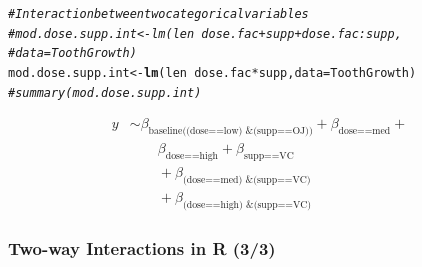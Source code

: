 \documentclass{beamer}\usepackage[]{graphicx}\usepackage[]{color}
\makeatletter
\newcommand{\hlcom}[1]{\textcolor[rgb]{0.678,0.584,0.686}{\textit{#1}}}%
\newcommand{\hlopt}[1]{\textcolor[rgb]{0,0,0}{#1}}%
\newcommand{\hlstd}[1]{\textcolor[rgb]{0.345,0.345,0.345}{#1}}%
\newcommand{\hlkwb}[1]{\textcolor[rgb]{0.69,0.353,0.396}{#1}}%
\newcommand{\hlkwc}[1]{\textcolor[rgb]{0.333,0.667,0.333}{#1}}%
\newcommand{\hlkwd}[1]{\textcolor[rgb]{0.737,0.353,0.396}{\textbf{#1}}}%
\newenvironment{kframe}{%
 \def\at@end@of@kframe{}%
 \ifinner\ifhmode%
  \def\at@end@of@kframe{\end{minipage}}%
  \begin{minipage}{\columnwidth}%
 \fi\fi%
 \def\FrameCommand##1{\hskip\@totalleftmargin \hskip-\fboxsep
 \colorbox{shadecolor}{##1}\hskip-\fboxsep
     \hskip-\linewidth \hskip-\@totalleftmargin \hskip\columnwidth}%
 \MakeFramed {\advance\hsize-\width
   \@totalleftmargin\z@ \linewidth\hsize
   \@setminipage}}%
 {\par\unskip\endMakeFramed%
 \at@end@of@kframe}
\newenvironment{knitrout}{}{} %
\makeatother
\begin{document}
{{{\begin{frame}[fragile]
\begin{knitrout}\tiny
{}\color{fgcolor}\begin{kframe}
\begin{alltt}
\hlcom{# Interaction between two categorical variables}
\hlcom{# mod.dose.supp.int <- lm(len ~ dose.fac + supp + dose.fac:supp,}
\hlcom{# data = ToothGrowth)}
\hlstd{mod.dose.supp.int} \hlkwb{<-} \hlkwd{lm}\hlstd{(len} \hlopt{~} \hlstd{dose.fac} \hlopt{*} \hlstd{supp,} \hlkwc{data} \hlstd{= ToothGrowth)}
\hlcom{# summary(mod.dose.supp.int)}
\end{alltt}
\end{kframe}
\end{knitrout}
\begin{align*}
y & \sim \beta_{\text{baseline((dose==low) \& (supp==OJ))}} +
\beta_\text{dose==med} + \\
& \qquad \beta_\text{dose==high} + \beta_\text{supp==VC} \\
& \qquad + \beta_\text{(dose==med) \& (supp==VC)} \\
& \qquad + \beta_\text{(dose==high) \& (supp==VC)} \nonumber
\end{align*}
\end{frame}


\begin{frame}[fragile]
\frametitle{Two-way Interactions in R (3/3)}



\end{frame}}}}
\end{document}
